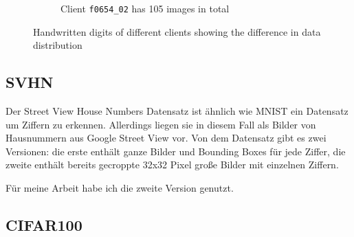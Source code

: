 \begin{figure}[tb]
\begin{subfigure}{0.4\textwidth}
        \caption{Client \texttt{f0654\_02} has 105 images in total}
    \end{subfigure}
    	\caption{Handwritten digits of different clients showing the difference in data distribution}
    \label{fig:mnist-digits}
\end{figure}

\subsection{SVHN}

Der Street View House Numbers Datensatz \parencite{netzer:2011} ist ähnlich wie MNIST ein Datensatz um Ziffern zu erkennen. Allerdings liegen sie in diesem Fall als Bilder von Hausnummern aus Google Street View vor. Von dem Datensatz gibt es zwei Versionen: die erste enthält ganze Bilder und Bounding Boxes für jede Ziffer, die zweite enthält bereits gecroppte 32x32 Pixel große Bilder mit einzelnen Ziffern.

Für meine Arbeit habe ich die zweite Version genutzt. 

\subsection{CIFAR100}
